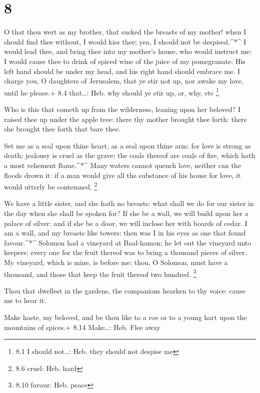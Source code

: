\hypertarget{section-7}{%
\section{8}\label{section-7}}

 O that thou wert as my brother, that sucked the breasts of
my mother! when I should find thee without, I would kiss thee; yea, I
should not be despised.\^{}*\^{}  I would lead thee, and
bring thee into my mother's house, who would instruct me: I would cause
thee to drink of spiced wine of the juice of my pomegranate.
 His left hand should be under my head, and his right hand
should embrace me.  I charge you, O daughters of Jerusalem,
that ye stir not up, nor awake my love, until he please.+ 8.4
that\ldots: Heb. why should ye stir up, or, why, etc \footnote{8.1 I
  should not\ldots: Heb. they should not despise me}

 Who is this that cometh up from the wilderness, leaning
upon her beloved? I raised thee up under the apple tree: there thy
mother brought thee forth: there she brought thee forth that bare thee.

 Set me as a seal upon thine heart, as a seal upon thine
arm: for love is strong as death; jealousy is cruel as the grave: the
coals thereof are coals of fire, which hath a most vehement
flame.\^{}*\^{}  Many waters cannot quench love, neither can
the floods drown it: if a man would give all the substance of his house
for love, it would utterly be contemned. \footnote{8.6 cruel: Heb. hard}

 We have a little sister, and she hath no breasts: what
shall we do for our sister in the day when she shall be spoken for?
 If she be a wall, we will build upon her a palace of
silver: and if she be a door, we will inclose her with boards of cedar.
 I am a wall, and my breasts like towers: then was I in his
eyes as one that found favour.\^{}*\^{}  Solomon had a
vineyard at Baal-hamon; he let out the vineyard unto keepers; every one
for the fruit thereof was to bring a thousand pieces of silver.
 My vineyard, which is mine, is before me: thou, O Solomon,
must have a thousand, and those that keep the fruit thereof two hundred.
\footnote{8.10 favour: Heb. peace}

 Thou that dwellest in the gardens, the companions hearken
to thy voice: cause me to hear it.

 Make haste, my beloved, and be thou like to a roe or to a
young hart upon the mountains of spices.+ 8.14 Make\ldots: Heb. Flee
away
